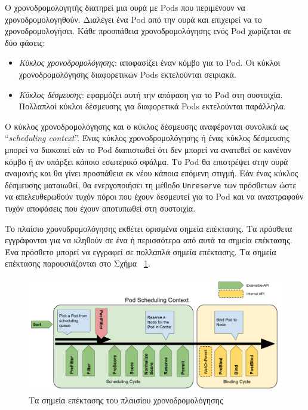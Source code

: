 Ο χρονοδρομολογητής διατηρεί μια ουρά με Pods που περιμένουν να
χρονοδρομολογηθούν. Διαλέγει ένα Pod από την ουρά και επιχειρεί να το
χρονοδρομολογήσει. Κάθε προσπάθεια χρονοδρομολόγησης ενός Pod χωρίζεται σε δύο
φάσεις:

\begin{itemize}
      \tightlist
      \item \textit{Κύκλος χρονοδρομολόγησης}: αποφασίζει έναν κόμβο για το Pod.
            Οι κύκλοι χρονοδρομολόγησης διαφορετικών Pods εκτελούνται σειριακά.
      \item \textit{Κύκλος δέσμευσης}: εφαρμόζει αυτή την απόφαση για το Pod στη
            συστοιχία. Πολλαπλοί κύκλοι δέσμευσης για διαφορετικά Pods
            εκτελούνται παράλληλα.
\end{itemize}

Ο κύκλος χρονοδρομολόγησης και ο κύκλος δέσμευσης αναφέρονται συνολικά ως
``\textit{scheduling context}''. Ένας κύκλος χρονοδρομολόγησης ή ένας κύκλος
δέσμευσης
μπορεί να διακοπεί εάν το Pod διαπιστωθεί ότι δεν μπορεί να ανατεθεί σε κανέναν
κόμβο ή αν υπάρξει κάποιο εσωτερικό σφάλμα. Το Pod θα επιστρέψει στην ουρά
αναμονής και θα γίνει προσπάθεια εκ νέου κάποια επόμενη στιγμή. Εάν ένας κύκλος
δέσμευσης ματαιωθεί, θα ενεργοποιήσει τη μέθοδο \texttt{Unreserve} των πρόσθετων
ώστε να απελευθερωθούν τυχόν πόροι που έχουν δεσμευτεί για το Pod και να
αναστραφούν τυχόν αποφάσεις που έχουν αποτυπωθεί στη συστοιχία.

Το πλαίσιο χρονοδρομολόγησης εκθέτει ορισμένα σημεία επέκτασης.  Τα πρόσθετα
εγγράφονται για να κληθούν σε ένα ή περισσότερα από αυτά τα σημεία επέκτασης.
Ένα πρόσθετο μπορεί να εγγραφεί σε πολλαπλά σημεία επέκτασης. Τα σημεία
επέκτασης παρουσιάζονται στο Σχήμα ~\ref{fig:scheduling-plugins-gr}.

\begin{figure}[ht]
      \centering
      \includegraphics[width=\textwidth]{chapters/background/img/scheduler.png}
      \caption{Τα σημεία επέκτασης του πλαισίου χρονοδρομολόγησης}
      \label{fig:scheduling-plugins-gr}
\end{figure}


